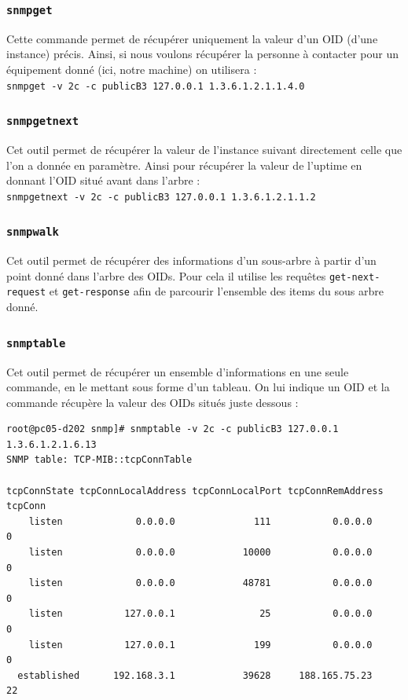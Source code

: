 \documentclass[12pt,a4paper,notitlepage]{article}
\begin{document}
\subsubsection{\texttt{snmpget}}
Cette commande permet de récupérer uniquement la valeur d'un OID (d'une instance) précis. Ainsi, si nous voulons récupérer la personne à contacter pour un équipement donné (ici, notre machine) on utilisera :\\

\noindent \texttt{snmpget -v 2c -c publicB3 127.0.0.1 1.3.6.1.2.1.1.4.0}


\subsubsection{\texttt{snmpgetnext}}
Cet outil permet de récupérer la valeur de l'instance suivant directement celle que l'on a donnée en paramètre. Ainsi pour récupérer la valeur de l'uptime en donnant l'OID situé avant dans l'arbre :\\

\noindent \texttt{snmpgetnext -v 2c -c publicB3 127.0.0.1 1.3.6.1.2.1.1.2}

\subsubsection{\texttt{snmpwalk}}
Cet outil permet de récupérer des informations d'un sous-arbre à partir d'un point donné dans l'arbre des OIDs. Pour cela il utilise les requêtes \texttt{get-next-request} et \texttt{get-response} afin de parcourir l'ensemble des items du sous arbre donné.

\subsubsection{\texttt{snmptable}}
Cet outil permet de récupérer un ensemble d'informations en une seule commande, en le mettant sous forme d'un tableau. On lui indique un OID et la commande récupère la valeur des OIDs situés juste dessous :\\

\begin{lstlisting}[title=Résultat snmptable pour les connexions TCP]
root@pc05-d202 snmp]# snmptable -v 2c -c publicB3 127.0.0.1 1.3.6.1.2.1.6.13
SNMP table: TCP-MIB::tcpConnTable

tcpConnState tcpConnLocalAddress tcpConnLocalPort tcpConnRemAddress tcpConn
    listen             0.0.0.0              111           0.0.0.0        0
    listen             0.0.0.0            10000           0.0.0.0        0
    listen             0.0.0.0            48781           0.0.0.0        0
    listen           127.0.0.1               25           0.0.0.0        0
    listen           127.0.0.1              199           0.0.0.0        0
  established      192.168.3.1            39628     188.165.75.23       22
\end{lstlisting}
\end{document}
